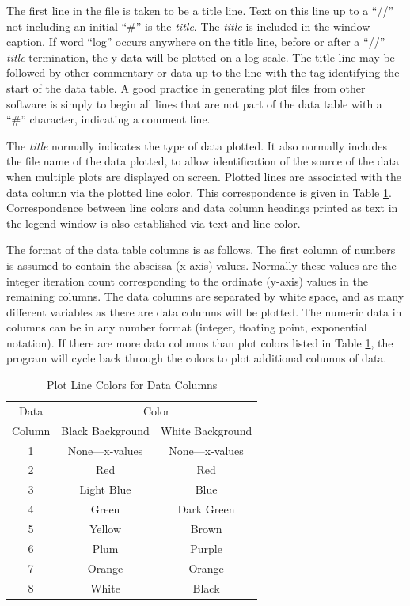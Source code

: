 \documentclass[12pt,twoside]{article}
\newcommand{\vsp}{\textvisiblespace}
\newcommand{\var}[1]{\text{\it #1}}
\numberwithin{equation}{section}
\begin{document}
The first line in the file is taken to be a title line. Text on this line up to a ``\vsp//'' not including an initial ``\#\vsp'' is the \emph{title}. The \emph{title} is included in the window caption. If word ``log'' occurs anywhere on the title line, before or after a ``\vsp//'' \emph{title} termination, the y-data will be plotted on a log scale.
The title line may be followed by other commentary or data up to the line with the \var{plotdata} tag identifying the start of the data table. A good practice in generating plot files from other software is simply to begin all lines that are not part of the data table with a ``\#'' character, indicating a comment line.

The \emph{title} normally indicates the type of data plotted. It also normally includes the file name of the data plotted, to allow identification of the source of the data when multiple plots are displayed on screen. Plotted lines are associated with the data column via the plotted line color. This correspondence is given in Table \ref{plotcolors}. Correspondence between line colors and data column headings printed as text in the legend window is also established via text and line color. 

The format of the data table columns is as follows. The first column of numbers is assumed to contain the abscissa (x-axis) values. Normally these values are the integer iteration count corresponding to the ordinate (y-axis) values in the remaining columns. The data columns are separated by white space, and as many different variables as there are data columns will be plotted. The numeric data in columns can be in any number format (integer, floating point, exponential notation). If there are more data columns than plot colors listed in Table \ref{plotcolors}, the program will cycle back through the colors to plot additional columns of data.

\begin{table}[!ht]
  \caption{Plot Line Colors for Data Columns} 
  \vspace{1.5mm}
  \label{plotcolors}
	\centering
		\begin{tabular}{|c|c|c|}
			\hline
      Data  & \multicolumn{2}{c|}{Color} \\
      \cline{2-3}
      Column  & Black Background & White Background \\
      \hline
			1      & None---x-values & None---x-values \\
			2      & Red & Red \\
			3      & Light Blue & Blue \\
			4      & Green & Dark Green \\
			5      & Yellow & Brown \\
			6      & Plum & Purple \\
			7      & Orange & Orange \\
			8      & White & Black \\
			\hline
		\end{tabular}
\end{table}
\end{document}
